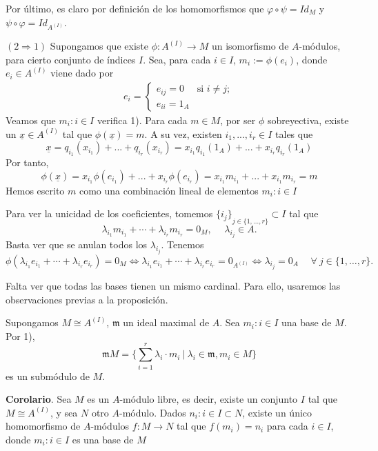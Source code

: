 \documentclass[a4paper,12pt]{article}
\begin{document}
Por último, es claro por definición de los homomorfismos que $\varphi\circ\psi=Id_{M}$ y $\psi\circ\varphi=Id_{A^{(I)}}$.

$(2\Rightarrow 1)$ Supongamos que existe $\phi: A^{(I)}\rightarrow M$ un isomorfismo de $A$-módulos, para cierto conjunto de índices $I$. Sea, para cada $i\in I$, $m_i:=\phi(e_i)$, donde $e_i\in A^{(I)}$ viene dado por
$$\begin{array}{rccl}
    e_i= \left\{ \begin{array}{ll}
         e_{ij}=0 & \mbox{si $i\neq j$};\\
         e_{ii}=1_A & \mbox{}\end{array} \right.
\end{array}$$    
Veamos que ${m_i:i\in I}$ verifica 1). Para cada $m\in M$, por ser $\phi$ sobreyectiva, existe un $\underline{x}\in A^{(I)}$ tal que $\phi(\underline{x})=m$. A su vez, existen $i_1,...,i_r\in I$ tales que 
$$\underline{x}=q_{i_1}(x_{i_1})+...+q_{i_r}(x_{i_r})=x_{i_1}q_{i_1}(1_A)+...+x_{i_r}q_{i_r}(1_A)$$ 
Por tanto, 
$$\phi(\underline{x})=x_{i_1}\phi(e_{i_1})+...+x_{i_r}\phi(e_{i_r})=x_{i_1}m_{i_1}+...+x_{i_1}m_{i_r}=m$$
Hemos escrito $m$ como una combinación lineal de elementos ${m_i:i\in I}$

Para ver la unicidad de los coeficientes, tomemos ${\{i_j\}}_{j\in\{1,\dots,r\}}\subset I$ tal que$$\lambda_{i_1}m_{i_1}+\cdots+\lambda_{i_r}m_{i_r}=0_M,\hspace{15pt}\lambda_{i_j}\in A.$$
Basta ver que se anulan todos los $\lambda_{i_j}$. Tenemos
$$\phi(\lambda_{i_1}e_{i_1}+\cdots+\lambda_{i_r}e_{i_r})=0_M\Longleftrightarrow\lambda_{i_1}e_{i_1}+\cdots+\lambda_{i_r}e_{i_r}=0_{A^{(I)}}\Longleftrightarrow\lambda_{i_j}=0_A\hspace{15pt}\forall\ j\in\{1,\dots,r\}.$$

Falta ver que todas las bases tienen un mismo cardinal. Para ello, usaremos las observaciones previas a la proposición.

Supongamos $M\cong A^{(I)}$, $\mathfrak{m}$ un ideal maximal de $A$. Sea ${m_i:i\in I}$ una base de $M$. Por 1), $$\mathfrak{m}M=\{\sum_{i=1}^r \lambda_i\cdot m_i\ |\  \lambda_i\in \mathfrak{m}, m_i\in M\}$$ 
es un submódulo de $M$. 

\textbf{Corolario}. Sea $M$ es un $A$-módulo libre, es decir, existe un conjunto $I$ tal que $M\cong A^{(I)}$, y sea $N$ otro $A$-módulo. Dados ${n_i:i\in I}\subset N$, existe un único homomorfismo de $A$-módulos $f:M\rightarrow N$ tal que $f(m_i)=n_i$ para cada $i\in I$, donde ${m_i: i\in I}$ es una base de $M$
\end{document}
